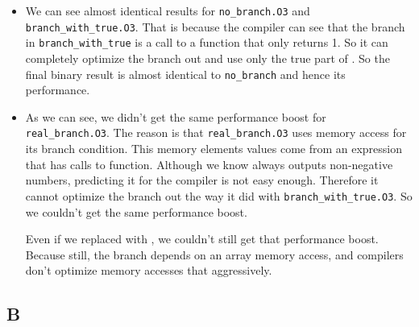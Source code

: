 \documentclass[12pt]{article}
\begin{document}
\begin{itemize}
\item 
We can see almost identical results for
\Verb+no_branch.O3+ and \Verb+branch_with_true.O3+. That is because the compiler can see that the branch in \Verb+branch_with_true+ is a call to a function that only returns 1. So it can completely optimize the branch out and use only the true part of . So the final binary result is almost identical to \Verb+no_branch+ and hence its performance.

\item 
As we can see, we didn't get the same performance boost for \Verb+real_branch.O3+. The reason is that \Verb+real_branch.O3+ uses memory access for its branch condition. This memory elements values come from an expression that has calls to  function. Although we know  always outputs non-negative numbers, predicting it for the compiler is not easy enough. Therefore it cannot optimize the branch out the way it did with \Verb+branch_with_true.O3+. So we couldn't get the same performance boost.

Even if we replaced  with , we couldn't still get that performance boost. Because still, the branch depends on an array memory access, and compilers don't optimize memory accesses that aggressively.



	\end{itemize}
	
	
	
	\subsection{B}
	
\end{document}
